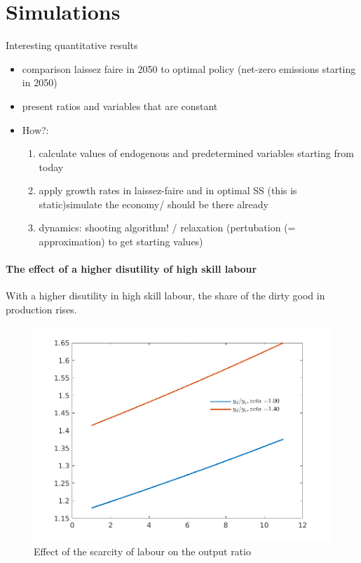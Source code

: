 \section{Simulations}\label{sec:simul}

Interesting quantitative results

\begin{itemize}
	\item comparison laissez faire in 2050 to optimal policy (net-zero emissions starting in 2050)
	\item present ratios and variables that are constant 
	\item How?: 
	\begin{enumerate}
	\item calculate values of endogenous and predetermined variables starting from today
	\item apply growth rates in laissez-faire and in optimal SS (this is static)\ar simulate the economy/ should be there already
	\item dynamics: shooting algorithm! / relaxation (pertubation (= approximation) to get starting values)
	\end{enumerate}
\end{itemize}

\paragraph{The effect of a higher disutility of high skill labour}

With a higher disutility in high skill labour, the share of the dirty good in production rises. 

\begin{figure}[h!!]
\includegraphics[width=1\textwidth]{../codding_model/Own/figures/Rep_agent/Yd_Yc_ratio_periods10_eppsilon0.40_zeta1.40_Ad08_Ac04_thetac0.70_thetad0.56_fullDisp0_HetGrowth1_tauul0.181_util0.png}
\caption{Effect of the scarcity of labour on the output ratio}
\end{figure}
